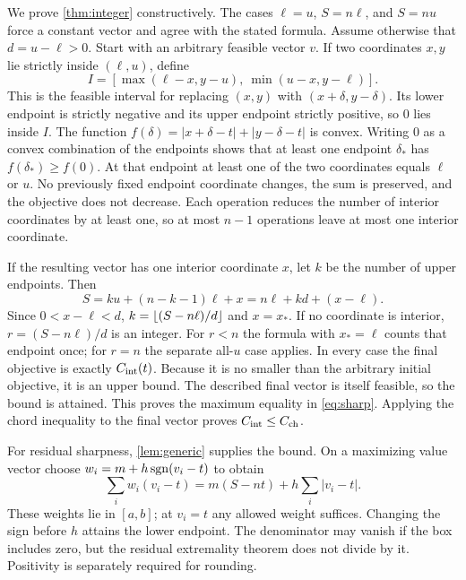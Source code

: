 We prove \cref{thm:integer} constructively. The cases $\ell=u$, $S=n\ell$,
and $S=nu$ force a constant vector and agree with the stated formula.
Assume otherwise that $d=u-\ell>0$. Start with an arbitrary feasible
vector $v$. If two coordinates $x,y$ lie strictly inside $(\ell,u)$, define
\begin{equation}
 I=[\max(\ell-x,y-u),\ \min(u-x,y-\ell)].
\end{equation}
This is the feasible interval for replacing $(x,y)$ with
$(x+\delta,y-\delta)$. Its lower endpoint is strictly negative and its
upper endpoint strictly positive, so $0$ lies inside $I$. The function
$f(\delta)=|x+\delta-t|+|y-\delta-t|$ is convex. Writing $0$ as a convex
combination of the endpoints shows that at least one endpoint
$\delta_*$ has $f(\delta_*)\ge f(0)$. At that endpoint at least one of
the two coordinates equals $\ell$ or $u$. No previously fixed endpoint
coordinate changes, the sum is preserved, and the objective does not
decrease. Each operation reduces the number of interior coordinates by at
least one, so at most $n-1$ operations leave at most one interior coordinate.

If the resulting vector has one interior coordinate $x$, let $k$ be the
number of upper endpoints. Then
\begin{equation}
 S=ku+(n-k-1)\ell+x
   =n\ell+kd+(x-\ell).
\end{equation}
Since $0<x-\ell<d$, $k=\left\lfloor(S-n\ell)/d\right\rfloor$ and
$x=x_*$. If no coordinate is interior, $r=(S-n\ell)/d$ is an integer.
For $r<n$ the formula with $x_*=\ell$ counts that endpoint once; for
$r=n$ the separate all-$u$ case applies. In every case the final objective
is exactly $C_{\rm int}(t)$. Because it is no smaller than the arbitrary
initial objective, it is an upper bound. The described final vector is
itself feasible, so the bound is attained. This proves the maximum equality
in \cref{eq:sharp}. Applying the chord inequality to the final vector
proves $C_{\rm int}\le C_{\rm ch}$.

For residual sharpness, \cref{lem:generic} supplies the bound. On a
maximizing value vector choose $w_i=m+h\operatorname{sgn}(v_i-t)$ to obtain
\begin{equation}
 \sum_iw_i(v_i-t)=m(S-nt)+h\sum_i|v_i-t|.
\end{equation}
These weights lie in $[a,b]$; at $v_i=t$ any allowed weight suffices.
Changing the sign before $h$ attains the lower endpoint. The denominator
may vanish if the box includes zero, but the residual extremality theorem
does not divide by it. Positivity is separately required for rounding.

